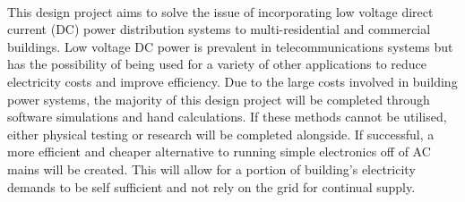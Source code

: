 \paragraph{}
This design project aims to solve the issue of incorporating low voltage direct current (DC) power distribution systems to multi-residential and commercial buildings. Low voltage DC power is prevalent in telecommunications systems but has the possibility of being used for a variety of other applications to reduce electricity costs and improve efficiency. Due to the large costs involved in building power systems, the majority of this design project will be completed through software simulations and hand calculations. If these methods cannot be utilised, either physical testing or research will be completed alongside. If successful, a more efficient and cheaper alternative to running simple electronics off of AC mains will be created. This will allow for a portion of building's electricity demands to be self sufficient and not rely on the grid for continual supply.   
 
\newpage
